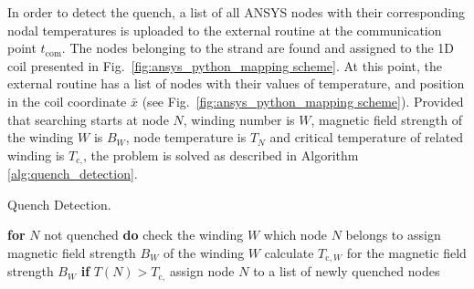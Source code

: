In order to detect the quench, a list of all ANSYS nodes with their corresponding nodal temperatures is uploaded to the external routine at the communication point $t_\text{com}$. The nodes belonging to the strand are found and assigned to the 1D coil presented in Fig.~\ref{fig:ansys_python_mapping scheme}. At this point, the external routine has a list of nodes with their values of temperature, and position in the coil coordinate $\bar{x}$ (see Fig.~\ref{fig:ansys_python_mapping scheme}). Provided that searching starts at node $N$, winding number is $W$, magnetic field strength of the winding $W$ is $B_W$, node temperature is $T_N$ and critical temperature of related winding is $T_{\text{c},}$, the problem is solved as described in Algorithm \ref{alg:quench_detection}.

\begin{algorithm}[H]
    \caption{Quench Detection.}
    \label{alg:quench_detection}
    \begin{algorithmic}[1]
    \STATE \textbf{for} $N$ not quenched \textbf{do}
    \STATE \hspace{0.5cm} check the winding $W$ which node $N$ belongs to
    \STATE \hspace{0.5cm} assign magnetic field strength $B_W$ of the winding $W$
    \STATE \hspace{0.5cm} calculate $T_{\text{c},W}$ for the magnetic field strength $B_W$
    \STATE \hspace{0.5cm} \textbf{if} $T(N) > T_{\text{c},}$
    \STATE \hspace{1.0cm} assign node $N$ to a list of newly quenched nodes
    \end{algorithmic}
\end{algorithm}